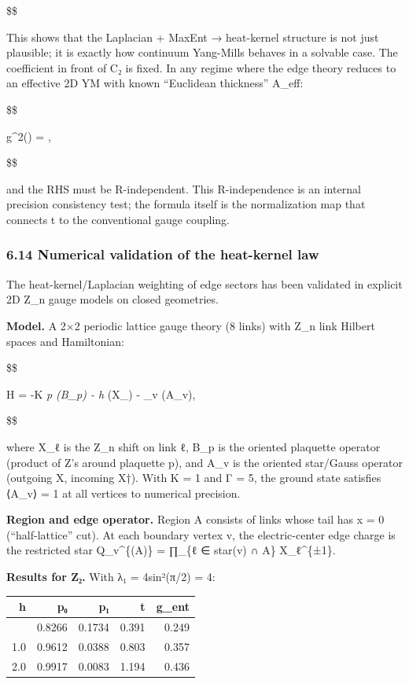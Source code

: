 \documentclass[11pt,a4paper]{article}
\theoremstyle{remark}
\begin{document}
\$\$

This shows that the Laplacian + MaxEnt → heat-kernel structure is not just
plausible; it is exactly how continuum Yang-Mills behaves in a solvable case.
The coefficient in front of C₂ is fixed. In any regime where the edge theory
reduces to an effective 2D YM with known ``Euclidean thickness'' A\_eff:

\$\$

g\^{}2(\mu) =  \cdot {},

\$\$

and the RHS must be R-independent. This R-independence is an internal
precision consistency test; the formula itself is the normalization map that
connects t to the conventional gauge coupling.

\subsubsection{6.14 Numerical validation of the heat-kernel law}\label{numerical-validation-of-the-heat-kernel-law}

The heat-kernel/Laplacian weighting of edge sectors has been validated in
explicit 2D Z\_n gauge models on closed geometries.

\textbf{Model.} A 2×2 periodic lattice gauge theory (8 links) with
Z\_n link Hilbert spaces and Hamiltonian:

\$\$

H = -K \sum\emph{p (B\_p) - h \sum}\ell {}(X\_\ell) - \Gamma \sum\_v (A\_v),

\$\$

where X\_ℓ is the Z\_n shift on link ℓ, B\_p is the oriented
plaquette operator (product of Z's around plaquette p), and A\_v is the
oriented star/Gauss operator (outgoing X, incoming X†). With
K = 1 and Γ = 5, the ground state satisfies ⟨A\_v⟩ = 1
at all vertices to numerical precision.

\textbf{Region and edge operator.} Region A consists of links whose tail has
x = 0 (``half-lattice'' cut). At each boundary vertex v, the electric-center
edge charge is the restricted star Q\_v\^{}\{(A)\} = ∏\_\{ℓ ∈ star(v) ∩ A\} X\_ℓ\^{}\{±1\}.

\textbf{Results for Z₂.} With λ₁ = 4sin²(π/2) = 4:

{\def\LTcaptype{none} %
\begin{longtable}[]{@{}rrrrr@{}}
\toprule\noalign{}
h & p₀ & p₁ & t & g\_ent \\
\midrule\noalign{}
\endhead
\bottomrule\noalign{}
\endlastfoot
0.5 & 0.8266 & 0.1734 & 0.391 & 0.249 \\
1.0 & 0.9612 & 0.0388 & 0.803 & 0.357 \\
2.0 & 0.9917 & 0.0083 & 1.194 & 0.436 \\
\end{longtable}
}
\end{document}
